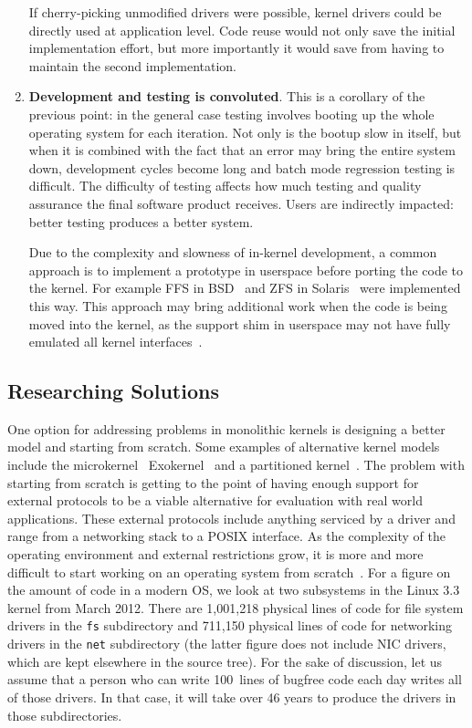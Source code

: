 \begin{enumerate}
	If cherry-picking unmodified drivers were possible, kernel
	drivers could be directly used at application level.  Code
	reuse would not only save the initial implementation effort, but
	more importantly it would save from having to
	maintain the second implementation.

\item   \textbf{Development and testing is convoluted}.  This is a
	corollary of the previous point:
	in the general case testing involves booting up the whole
	operating system for each iteration.  Not only is the bootup
	slow in itself, but when it is combined with the fact that an
	error may bring the entire system down, development cycles
	become long and batch mode regression testing is difficult.
	The difficulty of testing affects how much testing and quality
	assurance the final software product receives.	Users are
	indirectly impacted: better testing produces a better system.

	Due to the complexity and slowness of in-kernel development,
	a common approach is to implement a prototype in userspace
	before porting the code to the kernel.  For example FFS in
	BSD~\cite{mckusick:ffs_userspace} and ZFS in
	Solaris~\cite{bonwick:zfs} were implemented this way.  This
	approach may bring additional work when the code is being
	moved into the kernel, as the support shim in userspace
	may not have fully emulated all kernel
	interfaces~\cite{mckusick:ffs_userspace}.
\end{enumerate}

\subsection{Researching Solutions}

One option for addressing problems in monolithic kernels is designing
a better model and starting from scratch.  Some examples of
alternative kernel models include the
microkernel~\cite{accetta:mach,herder:minix3,hildebrand:qnx,liedtke:construction}
Exokernel~\cite{engler:exo} and
a partitioned kernel~\cite{baumann:multikernel,wentzlaff:casefos}.  The
problem with starting from scratch is getting to the point of having
enough support for external protocols to be a viable alternative for
evaluation with real world applications.  These external protocols
include anything serviced by a driver and range from a networking
stack to a POSIX interface.  As the complexity of the operating
environment and external restrictions grow, it is more and more
difficult to start working on an operating system from
scratch~\cite{pike:irrelevant}.  For a figure on the amount of code
in a modern OS, we look at two subsystems in the Linux 3.3 kernel
from March 2012.  There are 1,001,218 physical lines
of code for file system drivers in the \texttt{fs} subdirectory and
711,150 physical lines of code for networking drivers in the \texttt{net}
subdirectory (the latter figure does not include NIC drivers, which are
kept elsewhere in the source tree).  For the sake of discussion, let us
assume that a person who can write 100~lines of bugfree code each day
writes all of those drivers.  In that case, it will take over 46 years to
produce the drivers in those subdirectories.

